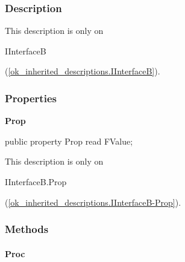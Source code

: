 \documentclass{report}
\newif\ifpdf
\begin{document}
\subsubsection*{\large{\textbf{Description}}\normalsize\hspace{1ex}\hfill}
This description is only on \begin{ttfamily}IInterfaceB\end{ttfamily}(\ref{ok_inherited_descriptions.IInterfaceB}).\subsubsection*{\large{\textbf{Properties}}\normalsize\hspace{1ex}\hfill}
\begin{list}{}{
\setlength{\itemindent}{0cm}
\setlength{\listparindent}{0cm}
\setlength{\leftmargin}{\evensidemargin}
\addtolength{\leftmargin}{\tmplength}
\settowidth{\labelsep}{X}
\addtolength{\leftmargin}{\labelsep}
\setlength{\labelwidth}{\tmplength}
}
\label{ok_inherited_descriptions.IInterfaceB-Prop}
\item[\textbf{Prop}\hfill]
\ifpdf
\begin{flushleft}
\fi
\begin{ttfamily}
public property Prop read FValue;\end{ttfamily}

\ifpdf
\end{flushleft}
\fi


\par This description is only on \begin{ttfamily}IInterfaceB.Prop\end{ttfamily}(\ref{ok_inherited_descriptions.IInterfaceB-Prop}).\end{list}
\subsubsection*{\large{\textbf{Methods}}\normalsize\hspace{1ex}\hfill}
\paragraph*{Proc}\hspace*{\fill}
\end{document}
